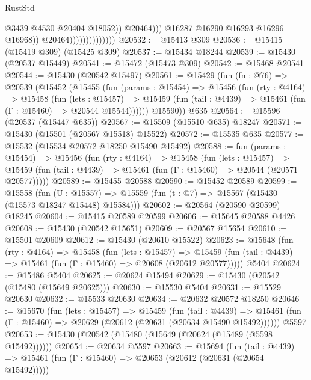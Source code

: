 \begin{lexlean}{RustStd}
\begin{coremodule}
{\begin{coremodule}
{{{{{{{{{{{{{{{{{{{{{{{{{{{{{{{{{{{{{{{{{{{{{{{{{{{{{{{{{{{{                                              @3439
                                              @4530
                                              @20404
                                              @18052))
                                          @20464)))
                                    @16287
                                    @16290
                                    @16293
                                    @16296
                                    @16968))
                                @20464))))))))))))))
@20532 := @15413 @309
@20536 := @15415 (@15419 @309) (@15425 @309)
@20537 := @15434 @18244
@20539 := @15430 (@20537 @15449)
@20541 := @15472 (@15473 @309)
@20542 := @15468 @20541
@20544 := @15430 (@20542 @15497)
@20561 := @15429
    (fun (fn : @76) =>
    @20539
      (@15452
        (@15455
          (fun (params : @15454) =>
          @15456
            (fun (rty : @4164) =>
            @15458
              (fun (lets : @15457) =>
              @15459 (fun (tail : @4439) => @15461 (fun (Γ : @15460) => @20544 @15544))))))
        @15590))
    @635
@20564 := @15596 (@20537 (@15447 @635))
@20567 := @15509 (@15510 @635) @18247
@20571 := @15430 (@15501 (@20567 @15518) @15522)
@20572 := @15535 @635
@20577 := @15532 (@15534 @20572 @18250 @15490 @15492)
@20588 := fun (params : @15454) =>
  @15456
    (fun (rty : @4164) =>
    @15458
      (fun (lets : @15457) =>
      @15459 (fun (tail : @4439) => @15461 (fun (Γ : @15460) => @20544 (@20571 @20577)))))
@20589 := @15455 @20588
@20590 := @15452 @20589
@20599 := @15558
    (fun (U : @15557) => @15559 (fun (t : @7) => @15567 (@15430 (@15573 @18247 @15448) @15584)))
@20602 := @20564 (@20590 @20599) @18245
@20604 := @15415 @20589 @20599
@20606 := @15645 @20588 @4426
@20608 := @15430 (@20542 @15651)
@20609 := @20567 @15654
@20610 := @15501 @20609
@20612 := @15430 (@20610 @15522)
@20623 := @15648
    (fun (rty : @4164) =>
    @15458
      (fun (lets : @15457) =>
      @15459 (fun (tail : @4439) => @15461 (fun (Γ : @15460) => @20608 (@20612 @20577)))))
    @5404
@20624 := @15486 @5404
@20625 := @20624 @15494
@20629 := @15430 (@20542 (@15480 (@15649 @20625)))
@20630 := @15530 @5404
@20631 := @15529 @20630
@20632 := @15533 @20630
@20634 := @20632 @20572 @18250
@20646 := @15670
    (fun (lets : @15457) =>
    @15459
      (fun (tail : @4439) =>
      @15461 (fun (Γ : @15460) => @20629 (@20612 (@20631 (@20634 @15490 @15492))))))
    @5597
@20653 := @15430 (@20542 (@15480 (@15649 (@20624 (@15489 (@5598 @15492))))))
@20654 := @20634 @5597
@20663 := @15694
    (fun (tail : @4439) => @15461 (fun (Γ : @15460) => @20653 (@20612 (@20631 (@20654 @15492)))))
}}}}}}}}}}}}}}}}}}}}}}}}}}}}}}}}}}}}}}}}}}}}}}}}}}}}}}}}}}}}
\end{coremodule}}
\end{coremodule}
\end{lexlean}
